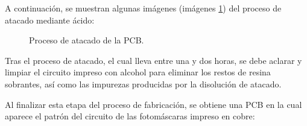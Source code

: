 \begin{enumerate}
   A continuación, se muestran algunas imágenes (imágenes \ref{fig:Atacado_PCB}) del proceso de atacado mediante ácido:
   

   \begin{figure}[H]
    \centering
    \caption{Proceso de atacado de la \ac{PCB}.}
    \label{fig:Atacado_PCB}
    \end{figure}
    
    Tras el proceso de atacado, el cual lleva entre una y dos horas, se debe aclarar y limpiar el circuito impreso con alcohol para eliminar los restos de resina sobrantes, así como las impurezas producidas por la disolución de atacado.
    
    Al finalizar esta etapa del proceso de fabricación, se obtiene una \ac{PCB} en la cual aparece el patrón del circuito de las fotomáscaras impreso en cobre:
    


\end{enumerate}
